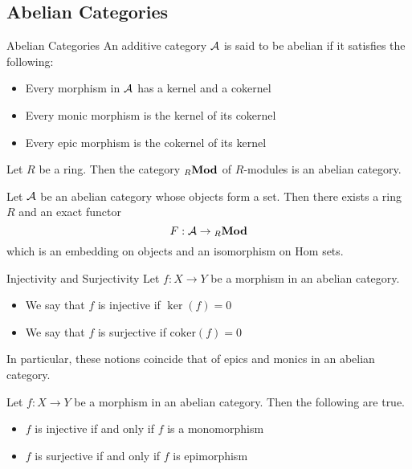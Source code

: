 \documentclass[a4paper]{article}
\begin{document}
\subsection{Abelian Categories}
\begin{defn}{Abelian Categories}{} An additive category $\mathcal{A}$ is said to be abelian if it satisfies the following: 
\begin{itemize}
\item Every morphism in $\mathcal{A}$ has a kernel and a cokernel
\item Every monic morphism is the kernel of its cokernel
\item Every epic morphism is the cokernel of its kernel
\end{itemize}
\end{defn}

\begin{thm}{}{} Let $R$ be a ring. Then the category ${_R}\bold{Mod}$ of $R$-modules is an abelian category. 
\end{thm}

\begin{thm}{}{} Let $\mathcal{A}$ be an abelian category whose objects form a set. Then there exists a ring $R$ and an exact functor $$F:\mathcal{A}\to{{_R}\bold{Mod}}$$ which is an embedding on objects and an isomorphism on $\text{Hom}$ sets. 
\end{thm}

\begin{defn}{Injectivity and Surjectivity}{} Let $f:X\to Y$ be a morphism in an abelian category. 
\begin{itemize}
\item We say that $f$ is injective if $\ker(f)=0$
\item We say that $f$ is surjective if $\text{coker}(f)=0$
\end{itemize}
\end{defn}

In particular, these notions coincide that of epics and monics in an abelian category. 

\begin{prp}{}{} Let $f:X\to Y$ be a morphism in an abelian category. Then the following are true. 
\begin{itemize}
\item $f$ is injective if and only if $f$ is a monomorphism
\item $f$ is surjective if and only if $f$ is epimorphism
\end{itemize}
\end{prp}
\end{document}
